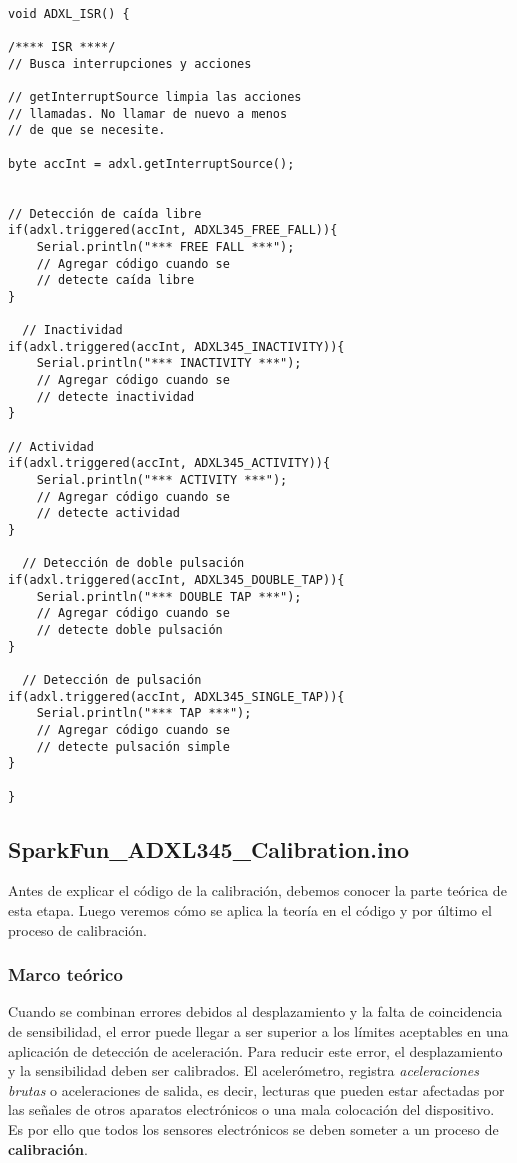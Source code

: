 \documentclass[10pt, a4paper, twocolumn]{article} %
\begin{document}
\small{
\begin{verbatim}

void ADXL_ISR() {

/**** ISR ****/
// Busca interrupciones y acciones
  
// getInterruptSource limpia las acciones
// llamadas. No llamar de nuevo a menos
// de que se necesite.

byte accInt = adxl.getInterruptSource();
  
  
// Detección de caída libre
if(adxl.triggered(accInt, ADXL345_FREE_FALL)){
	Serial.println("*** FREE FALL ***");
    // Agregar código cuando se 
    // detecte caída libre 
} 
  
  // Inactividad
if(adxl.triggered(accInt, ADXL345_INACTIVITY)){
    Serial.println("*** INACTIVITY ***");
	// Agregar código cuando se 
    // detecte inactividad
}
  
// Actividad
if(adxl.triggered(accInt, ADXL345_ACTIVITY)){
    Serial.println("*** ACTIVITY ***"); 
    // Agregar código cuando se 
    // detecte actividad
}
  
  // Detección de doble pulsación
if(adxl.triggered(accInt, ADXL345_DOUBLE_TAP)){
    Serial.println("*** DOUBLE TAP ***");
    // Agregar código cuando se 
    // detecte doble pulsación
}
  
  // Detección de pulsación
if(adxl.triggered(accInt, ADXL345_SINGLE_TAP)){
    Serial.println("*** TAP ***");
    // Agregar código cuando se 
    // detecte pulsación simple
} 

}

\end{verbatim}
}

\subsection{SparkFun\_ADXL345\_Calibration.ino}

Antes de explicar el código de la calibración, debemos conocer la parte teórica de esta etapa. Luego veremos cómo se aplica la teoría en el código y por último el proceso de calibración.

\subsubsection{Marco teórico}
Cuando se combinan errores debidos al desplazamiento y la falta de coincidencia de sensibilidad, el error puede llegar a  ser superior a los límites aceptables en una aplicación de detección de aceleración. Para reducir este error, el desplazamiento y la sensibilidad deben ser calibrados. 
El acelerómetro, registra \textit{aceleraciones brutas} o aceleraciones de salida, es decir, lecturas que pueden estar afectadas por las señales de otros aparatos electrónicos o una mala colocación del dispositivo. Es por ello que todos los sensores electrónicos se deben someter a un proceso de \textbf{calibración}.
\end{document}
